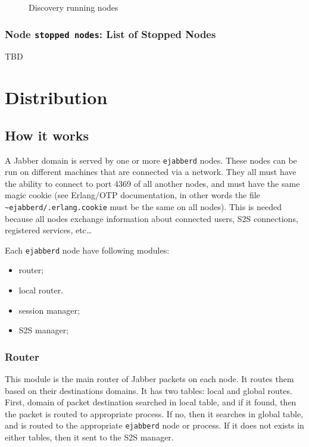 \documentclass[10pt]{article}
\newcommand{\imgscale}{0.58}
\newcommand{\insimg}[1]{\insscaleimg{\imgscale}{#1}}
\newcommand{\insscaleimg}[2]{
  \imgsrc{#2}{}
  \begin{latexonly}
    \scalebox{#1}{\texttt{[image: \#2]}}
  \end{latexonly}
}
\newcommand{\ejabberd}{\texttt{ejabberd}}
\newcommand{\Jabber}{Jabber}
\begin{document}
\begin{figure}[htbp]
  \centering
  \insimg{discorunnodes.png}
  \caption{Discovery running nodes}
  \label{fig:discorunnodes}
\end{figure}

\subsubsection{Node \texttt{stopped nodes}: List of Stopped Nodes}







TBD

\section{Distribution}
\label{sec:distribution}


\subsection{How it works}
\label{sec:howitworks}



A \Jabber{} domain is served by one or more \ejabberd{} nodes.  These nodes can
be run on different machines that are connected via a network.  They all must
have the ability to connect to port 4369 of all another nodes, and must have
the same magic cookie (see Erlang/OTP documentation, in other words the file
\texttt{\~{}ejabberd/.erlang.cookie} must be the same on all nodes). This is
needed because all nodes exchange information about connected users, S2S
connections, registered services, etc\ldots



Each \ejabberd{} node have following modules:
\begin{itemize}
\item router;
\item local router.
\item session manager;
\item S2S manager;
\end{itemize}


\subsubsection{Router}

This module is the main router of \Jabber{} packets on each node.  It routes
them based on their destinations domains.  It has two tables: local and global
routes.  First, domain of packet destination searched in local table, and if it
found, then the packet is routed to appropriate process.  If no, then it
searches in global table, and is routed to the appropriate \ejabberd{} node or
process.  If it does not exists in either tables, then it sent to the S2S
manager.
\end{document}

